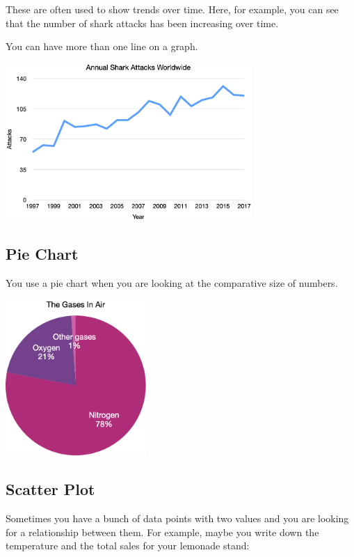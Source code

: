 These are often used to show trends over time. Here, for example, you
can see that the number of shark attacks has been increasing over
time.

You can have more than one line on a graph.

\includegraphics[width=0.7\textwidth]{SharksLine1.png}

\subsection{Pie Chart}

You use a pie chart when you are looking at the comparative size of numbers.

\includegraphics[width=0.4\textwidth]{AirPie.png}

\subsection{Scatter Plot}

Sometimes you have a bunch of data points with two values and you are
looking for a relationship between them.  For example, maybe you write
down the temperature and the total sales for your lemonade stand:

